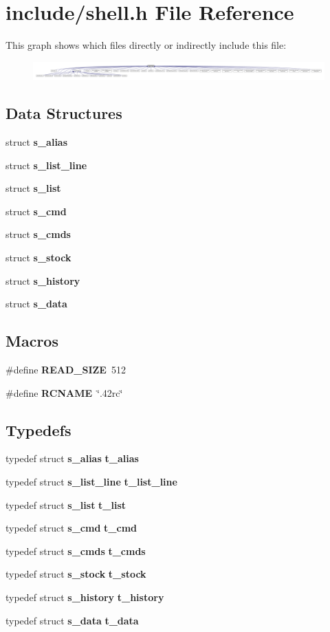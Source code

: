 \section{include/shell.h File Reference}
\label{shell_8h}
This graph shows which files directly or indirectly include this file\-:
\nopagebreak
\begin{figure}[H]
\begin{center}
\leavevmode
\includegraphics[width=350pt]{shell_8h__dep__incl}
\end{center}
\end{figure}
\subsection*{Data Structures}
\begin{DoxyCompactItemize}
\item 
struct {\bf s\-\_\-alias}
\item 
struct {\bf s\-\_\-list\-\_\-line}
\item 
struct {\bf s\-\_\-list}
\item 
struct {\bf s\-\_\-cmd}
\item 
struct {\bf s\-\_\-cmds}
\item 
struct {\bf s\-\_\-stock}
\item 
struct {\bf s\-\_\-history}
\item 
struct {\bf s\-\_\-data}
\end{DoxyCompactItemize}
\subsection*{Macros}
\begin{DoxyCompactItemize}
\item 
\#define {\bf R\-E\-A\-D\-\_\-\-S\-I\-Z\-E}~512
\item 
\#define {\bf R\-C\-N\-A\-M\-E}~\char`\"{}.\-42rc\char`\"{}
\end{DoxyCompactItemize}
\subsection*{Typedefs}
\begin{DoxyCompactItemize}
\item 
typedef struct {\bf s\-\_\-alias} {\bf t\-\_\-alias}
\item 
typedef struct {\bf s\-\_\-list\-\_\-line} {\bf t\-\_\-list\-\_\-line}
\item 
typedef struct {\bf s\-\_\-list} {\bf t\-\_\-list}
\item 
typedef struct {\bf s\-\_\-cmd} {\bf t\-\_\-cmd}
\item 
typedef struct {\bf s\-\_\-cmds} {\bf t\-\_\-cmds}
\item 
typedef struct {\bf s\-\_\-stock} {\bf t\-\_\-stock}
\item 
typedef struct {\bf s\-\_\-history} {\bf t\-\_\-history}
\item 
typedef struct {\bf s\-\_\-data} {\bf t\-\_\-data}
\end{DoxyCompactItemize}
